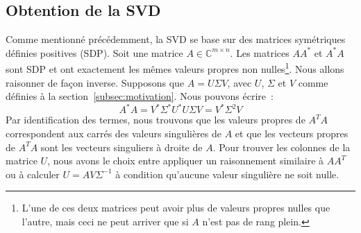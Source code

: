 \documentclass[a4paper, 11pt]{article}
\begin{document}
\subsection{Obtention de la SVD}\label{subsec:obtention}
Comme mentionné précédemment, la SVD se base sur des matrices symétriques définies positives (SDP). Soit une matrice $A \in \mathbb{C}^{m \times n}$. Les matrices $AA^*$ et $A^* A$ sont SDP et ont exactement les mêmes valeurs propres non nulles\footnote{L'une de ces deux matrices peut avoir plus de valeurs propres nulles que l'autre, mais ceci ne peut arriver que si $A$ n'est pas de rang plein.}. Nous allons raisonner de façon inverse. Supposons que $A = U \Sigma V$, avec $U$, $\Sigma$ et $V$ comme définies à la section~\ref{subsec:motivation}. Nous pouvons écrire~:
\begin{equation}
    A^* A = V^* \Sigma^* U^* U \Sigma V = V^* \Sigma^2 V
\end{equation}
Par identification des termes, nous trouvons que les valeurs propres de $A^T A$ correspondent aux carrés des valeurs singulières de $A$ et que les vecteurs propres de $A^T A$ sont les vecteurs singuliers à droite de $A$. Pour trouver les colonnes de la matrice $U$, nous avons le choix entre appliquer un raisonnement similaire à $AA^T$ ou à calculer $U = A V \Sigma^{-1}$ à condition qu'aucune valeur singulière ne soit nulle.
\end{document}
